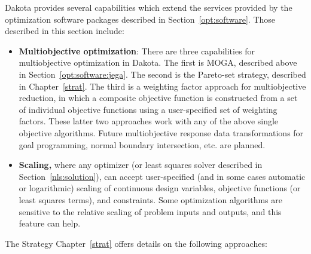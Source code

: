 Dakota provides several capabilities which extend the services
provided by the optimization software packages described in
Section~\ref{opt:software}. Those described in this section include:
\begin{itemize}
\item {\bf Multiobjective optimization}: There are three capabilities
  for multiobjective optimization in Dakota. The first is MOGA,
  described above in Section~\ref{opt:software:jega}. The second is
  the Pareto-set strategy, described in Chapter~\ref{strat}. The
  third is a weighting factor approach for multiobjective reduction,
  in which a composite objective function is constructed from a set of
  individual objective functions using a user-specified set of
  weighting factors. These latter two approaches work with any of the
  above single objective algorithms. Future multiobjective response
  data transformations for goal programming, normal boundary
  intersection, etc. are planned.
\item {\bf Scaling,} where any optimizer (or least squares solver
  described in Section~\ref{nls:solution}), can accept user-specified
  (and in some cases automatic or logarithmic) scaling of continuous
  design variables, objective functions (or least squares terms), and
  constraints. Some optimization algorithms are sensitive to the
  relative scaling of problem inputs and outputs, and this feature can
  help.
\end{itemize}
The Strategy Chapter~\ref{strat} offers details on the following
approaches:
